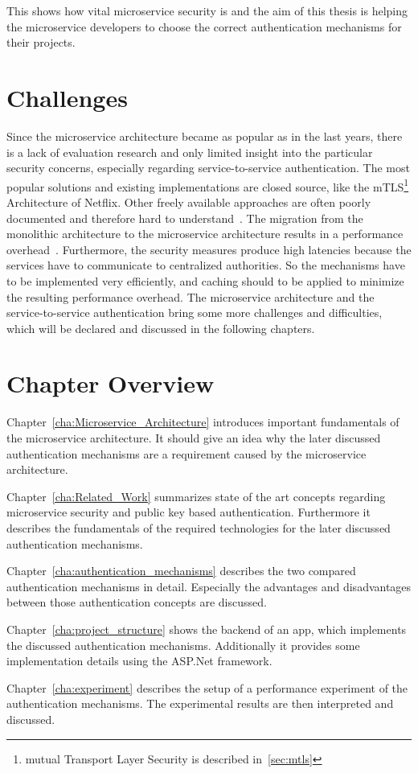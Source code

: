 This shows how vital microservice security is and the aim of this thesis is helping the microservice developers to choose the correct authentication mechanisms for their projects.

\section{Challenges}
Since the microservice architecture became as popular as in the last years, there is a lack of evaluation research and only limited insight into the particular security concerns, especially regarding service-to-service authentication. 
The most popular solutions and existing implementations are closed source, like the mTLS\footnote{mutual Transport Layer Security is described in~\ref{sec:mtls}} Architecture of Netflix.
Other freely available approaches are often poorly documented and therefore hard to understand~\cite{yarygina2018overcoming}.
The migration from the monolithic architecture to the microservice architecture results in a performance overhead~\cite{ueda2016workload}.
Furthermore, the security measures produce high latencies because the services have to communicate to centralized authorities.
So the mechanisms have to be implemented very efficiently, and caching should to be applied to minimize the resulting performance overhead.
The microservice architecture and the service-to-service authentication bring some more challenges and difficulties, which will be declared and discussed in the following chapters.

\section{Chapter Overview}
Chapter~\ref{cha:Microservice_Architecture} introduces important fundamentals of the microservice architecture. 
It should give an idea why the later discussed authentication mechanisms are a requirement caused by the microservice architecture.

Chapter~\ref{cha:Related_Work} summarizes state of the art concepts regarding microservice security and public key based authentication.
Furthermore it describes the fundamentals of the required technologies for the later discussed authentication mechanisms.

Chapter~\ref{cha:authentication_mechanisms} describes the two compared authentication mechanisms in detail.
Especially the advantages and disadvantages between those authentication concepts are discussed.

Chapter~\ref{cha:project_structure} shows the backend of an app, which implements the discussed authentication mechanisms.
Additionally it provides some implementation details using the ASP.Net framework.

Chapter~\ref{cha:experiment} describes the setup of a performance experiment of the authentication mechanisms.
The experimental results are then interpreted and discussed.
